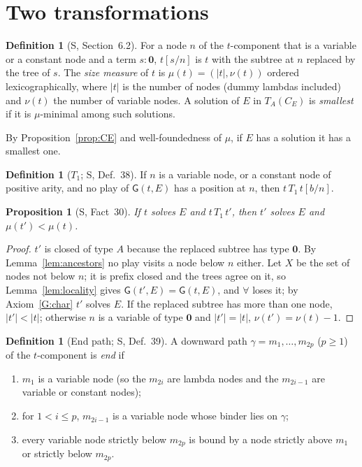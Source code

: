 \documentclass[11pt]{article}
\newcommand{\Ground}{\mathbf{0}}
\newcommand{\Gm}{\mathsf{G}}
\newcommand{\CE}{C_E}
\theoremstyle{plain}
\newtheorem{proposition}[theorem]{Proposition}
\theoremstyle{definition}
\newtheorem{definition}[theorem]{Definition}
\theoremstyle{remark}
\begin{document}
\section{Two transformations}

\begin{definition}[S, Section~6.2]
For a node $n$ of the $t$-component that is a variable or a constant
node and a term $s:\Ground$, $t[s/n]$ is $t$ with the subtree at $n$
replaced by the tree of $s$.  The \emph{size measure} of $t$ is
$\mu(t)=(|t|,\nu(t))$ ordered lexicographically, where $|t|$ is the
number of nodes (dummy lambdas included) and $\nu(t)$ the number of
variable nodes.  A solution of $E$ in $T_A(\CE)$ is \emph{smallest} if it
is $\mu$-minimal among such solutions.
\end{definition}

By Proposition~\ref{prop:CE} and well-foundedness of $\mu$, if $E$ has a
solution it has a smallest one.

\begin{definition}[$T_1$; S, Def.~38]
If $n$ is a variable node, or a constant node of positive arity, and no
play of $\Gm(t,E)$ has a position at $n$, then $t\,T_1\,t[b/n]$.
\end{definition}

\begin{proposition}[S, Fact~30]\label{prop:T1}
If $t$ solves $E$ and $t\,T_1\,t'$, then $t'$ solves $E$ and
$\mu(t')<\mu(t)$.
\end{proposition}
\begin{proof}
$t'$ is closed of type $A$ because the replaced subtree has type
$\Ground$.  By Lemma~\ref{lem:ancestors} no play visits a node below $n$
either.  Let $X$ be the set of nodes not below $n$; it is prefix closed
and the trees agree on it, so Lemma~\ref{lem:locality} gives
$\Gm(t',E)=\Gm(t,E)$, and $\forall$ loses it; by Axiom~\ref{G:char} $t'$
solves $E$.  If the replaced subtree has more than one node, $|t'|<|t|$;
otherwise $n$ is a variable of type $\Ground$ and $|t'|=|t|$,
$\nu(t')=\nu(t)-1$.
\end{proof}

\begin{definition}[End path; S, Def.~39]\label{def:endpath}
A downward path $\gamma=m_1,\dots,m_{2p}$ ($p\ge1$) of the $t$-component
is \emph{end} if
\begin{enumerate}
\item $m_1$ is a variable node (so the $m_{2i}$ are lambda nodes and the
  $m_{2i-1}$ are variable or constant nodes);
\item for $1<i\le p$, $m_{2i-1}$ is a variable node whose binder lies on
  $\gamma$;
\item every variable node strictly below $m_{2p}$ is bound by a node
  strictly above $m_1$ or strictly below $m_{2p}$.
\end{enumerate}
\end{definition}
\end{document}
